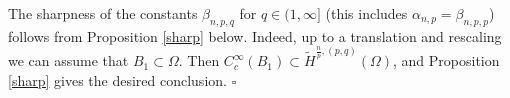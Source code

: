 \documentclass[11pt, a4paper]{article}
\begin{document}
The sharpness of the constants $\beta_{n,p,q}$ for $q\in (1,\infty]$ (this includes $\alpha_{n,p}=\beta_{n,p,p}$) follows from Proposition \ref{sharp} below. Indeed, up to a translation and rescaling we can assume that $B_1\subset\Omega$. Then $C^\infty_c(B_1)\subset \tilde H^{\frac np,(p,q)}(\Omega)$, and Proposition \ref{sharp} gives the desired conclusion.
\hfill $\square$




\medskip
\end{document}
